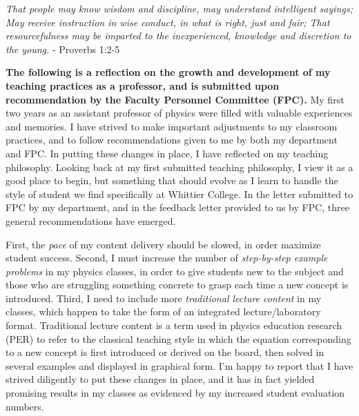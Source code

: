\documentclass[../../main.tex]{subfiles}
\begin{document}
\epigraph{\textit{That people may know wisdom and discipline, may understand intelligent sayings; May receive instruction in wise conduct, in what is right, just and fair; That resourcefulness may be imparted to the inexperienced, knowledge and discretion to the young.} - Proverbs 1:2-5}{}

\textbf{The following is a reflection on the growth and development of my teaching practices as a professor, and is submitted upon recommendation by the Faculty Personnel Committee (FPC).}  My first two years as an assistant professor of physics were filled with valuable experiences and memories.  I have strived to make important adjustments to my classroom practices, and to follow recommendations given to me by both my department and FPC.  In putting these changes in place, I have reflected on my teaching philosophy.  Looking back at my first submitted teaching philosophy, I view it as a good place to begin, but something that should evolve as I learn to handle the style of student we find specifically at Whittier College.  In the letter submitted to FPC by my department, and in the feedback letter provided to us by FPC, three general recommendations have emerged. \\ \hspace{0.1cm}

First, the \textit{pace} of my content delivery should be slowed, in order maximize student success.  Second, I must increase the number of \textit{step-by-step example problems} in my physics classes, in order to give students new to the subject and those who are struggling something concrete to grasp each time a new concept is introduced.  Third, I need to include more \textit{traditional lecture content} in my classes, which happen to take the form of an integrated lecture/laboratory format.  Traditional lecture content is a term used in physics education research (PER) to refer to the classical teaching style in which the equation corresponding to a new concept is first introduced or derived on the board, then solved in several examples and displayed in graphical form.  I'm happy to report that I have strived diligently to put these changes in place, and it has in fact yielded promising results in my classes as evidenced by my increased student evaluation numbers. \\ \hspace{0.1cm}
\end{document}
